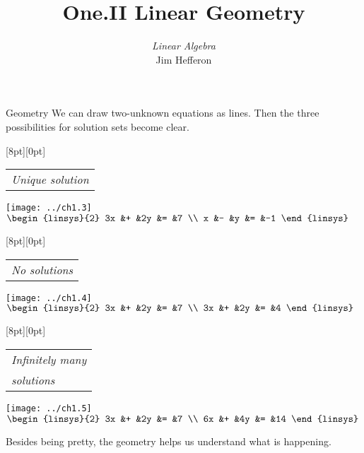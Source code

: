 \documentclass[10pt,t]{beamer}
\title[Linear Geometry] %
{One.II Linear Geometry}
\author{\textit{Linear Algebra} \\ {\small Jim Hef{}feron}}
\institute{
  \texttt{http://joshua.smcvt.edu/linearalgebra}
}
\date{}
\begin{document}
\begin{frame}
  \titlepage
\end{frame}

\begin{frame}{Geometry} 
We can draw two-unknown equations as lines.
Then the three possibilities for solution sets become clear.
\pause
\begin{center} %
  \begin{minipage}[b]{1.35in}
    \raisebox{-2pt}[8pt][0pt]{\small \begin{tabular}{@{}l}
      \small \textit{Unique solution}
    \end{tabular}}
    \begin{center}
      \texttt{[image: ../ch1.3]} \\[.75ex]
      \small $\begin{linsys}{2}
                         3x  &+  &2y  &=  &7   \\
                         x   &-  &y   &=  &-1
                       \end{linsys}$
    \end{center}
  \end{minipage}
  \hspace*{0em}
  \begin{minipage}[b]{1.35in}
    \raisebox{-2pt}[8pt][0pt]{\small \begin{tabular}{@{}l}
      \small \textit{No solutions}
    \end{tabular}}
    \begin{center}
      \texttt{[image: ../ch1.4]} \\[.75ex]
      \small $\begin{linsys}{2}
                         3x  &+  &2y  &=  &7   \\
                         3x  &+  &2y  &=  &4
                       \end{linsys}$
    \end{center}
  \end{minipage}
  \hspace*{0em}
  \begin{minipage}[b]{1.35in}
    \raisebox{-2pt}[8pt][0pt]{\small \begin{tabular}[t]{@{}l}
      \textit{Infinitely many} \\
      \textit{solutions}
    \end{tabular}}
    \begin{center}
      \texttt{[image: ../ch1.5]}         \\[.75ex]
      \small $ \begin{linsys}{2}
                         3x  &+  &2y  &=  &7   \\
                         6x  &+  &4y  &=  &14
                       \end{linsys}$
    \end{center}
  \end{minipage}
\end{center}
Besides being pretty, the geometry helps us understand what is happening.
\end{frame}
\end{document}
